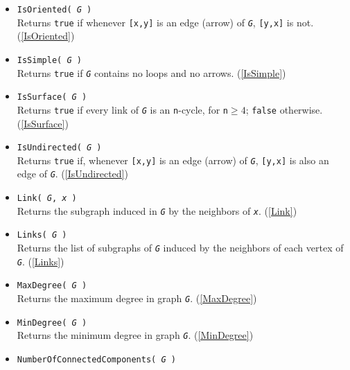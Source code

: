 \documentclass[a4paper,11pt]{report}
\begin{document}
{{\begin{itemize}
 Returns \texttt{true} when \mbox{\texttt{\mdseries\slshape G}} does not have loops: edges of the form \texttt{[x,x]}. (\ref{IsLoopless}) 
\item \texttt{IsOriented( \mbox{\texttt{\mdseries\slshape G}} )}\\
 Returns \texttt{true} if whenever \texttt{[x,y]} is an edge (arrow) of \mbox{\texttt{\mdseries\slshape G}}, \texttt{[y,x]} is not. (\ref{IsOriented}) 
\item \texttt{IsSimple( \mbox{\texttt{\mdseries\slshape G}} )}\\
 Returns \texttt{true} if \mbox{\texttt{\mdseries\slshape G}} contains no loops and no arrows. (\ref{IsSimple}) 
\item \texttt{IsSurface( \mbox{\texttt{\mdseries\slshape G}} )}\\
 Returns \texttt{true} if every link of \mbox{\texttt{\mdseries\slshape G}} is an \texttt{n}-cycle, for \texttt{n}$\geq 4$; \texttt{false} otherwise. (\ref{IsSurface}) 
\item \texttt{IsUndirected( \mbox{\texttt{\mdseries\slshape G}} )}\\
 Returns \texttt{true} if, whenever \texttt{[x,y]} is an edge (arrow) of \mbox{\texttt{\mdseries\slshape G}}, \texttt{[y,x]} is also an edge of \mbox{\texttt{\mdseries\slshape G}}. (\ref{IsUndirected}) 
\item \texttt{Link( \mbox{\texttt{\mdseries\slshape G}}, \mbox{\texttt{\mdseries\slshape x}} )}\\
 Returns the subgraph induced in \mbox{\texttt{\mdseries\slshape G}} by the neighbors of \mbox{\texttt{\mdseries\slshape x}}. (\ref{Link}) 
\item \texttt{Links( \mbox{\texttt{\mdseries\slshape G}} )}\\
 Returns the list of subgraphs of \mbox{\texttt{\mdseries\slshape G}} induced by the neighbors of each vertex of \mbox{\texttt{\mdseries\slshape G}}. (\ref{Links}) 
\item \texttt{MaxDegree( \mbox{\texttt{\mdseries\slshape G}} )}\\
 Returns the maximum degree in graph \mbox{\texttt{\mdseries\slshape G}}. (\ref{MaxDegree}) 
\item \texttt{MinDegree( \mbox{\texttt{\mdseries\slshape G}} )}\\
 Returns the minimum degree in graph \mbox{\texttt{\mdseries\slshape G}}. (\ref{MinDegree}) 
\item \texttt{NumberOfConnectedComponents( \mbox{\texttt{\mdseries\slshape G}} )}\\

\end{itemize}}}
\end{document}
